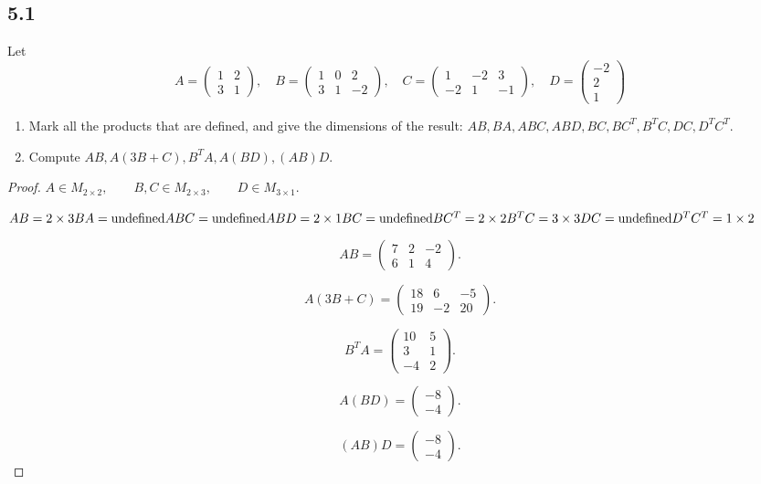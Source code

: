 \documentclass{amsart}
\begin{document}
\subsection*{5.1} Let
\[
A = \begin{pmatrix} 1 & 2 \\ 3 & 1 \end{pmatrix}, \quad 
B = \begin{pmatrix} 1 & 0 & 2 \\ 3 & 1 & -2 \end{pmatrix}, \quad 
C = \begin{pmatrix} 1 & -2 & 3 \\ -2 & 1 & -1 \end{pmatrix}, \quad 
D = \begin{pmatrix} -2 \\ 2 \\ 1 \end{pmatrix}
\]
\begin{enumerate}[label=\alph*)]
\item Mark all the products that are defined, and give the dimensions of the result: $AB, BA, ABC, ABD, BC, BC^T, B^T C, DC, D^T C^T$.
\item Compute $AB, A(3B + C), B^T A, A(BD), (AB)D$.
\end{enumerate}
\begin{proof}
    $
A\in M_{2\times2},\qquad
B,C\in M_{2\times3},\qquad
D\in M_{3\times1}.
$

$
AB =2\times3\\
BA =\text{undefined}\\
ABC = \text{undefined}\\
ABD = 2\times1\\
BC =\text{undefined}\\
BC^T = 2\times2\\
B^TC =3\times3\\
DC =\text{undefined}\\
D^TC^T = 1\times2
$

\[
AB=
\begin{pmatrix}
7&2&-2\\
6&1&4
\end{pmatrix}.
\]

\[
A(3B+C)=
\begin{pmatrix}
18&6&-5\\
19&-2&20
\end{pmatrix}.
\]

\[
B^TA=
\begin{pmatrix}
10&5\\
3&1\\
-4&2
\end{pmatrix}.
\]

\[
A(BD)=
\begin{pmatrix}
-8\\
-4
\end{pmatrix}.
\]

\[
(AB)D=
\begin{pmatrix}
-8\\
-4
\end{pmatrix}.
\]
\end{proof}
\end{document}
